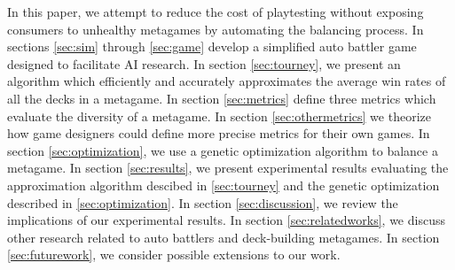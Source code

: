 
In this paper, we attempt to reduce the cost of playtesting without
exposing consumers to unhealthy metagames by automating the balancing
process. In sections \ref{sec:sim} through \ref{sec:game} develop a
simplified auto battler game designed to facilitate AI research. In
section \ref{sec:tourney}, we present an algorithm which efficiently
and accurately approximates the average win rates of all the decks in
a metagame. In section \ref{sec:metrics} define three metrics which
evaluate the diversity of a metagame. In section
\ref{sec:othermetrics} we theorize how game designers could define
more precise metrics for their own games. In section
\ref{sec:optimization}, we use a genetic optimization algorithm to
balance a metagame. In section \ref{sec:results}, we present
experimental results evaluating the approximation algorithm descibed
in \ref{sec:tourney} and the genetic optimization described in
\ref{sec:optimization}. In section \ref{sec:discussion}, we review the
implications of our experimental results. In section
\ref{sec:relatedworks}, we discuss other research related to auto
battlers and deck-building metagames. In section \ref{sec:futurework},
we consider possible extensions to our work.






